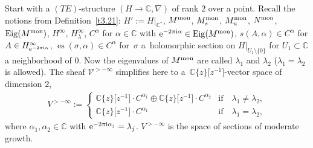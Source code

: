 \documentclass[10pt,a4paper]{amsart}
\numberwithin{equation}{section}
\numberwithin{figure}{section}
\newcommand{\C}{{\mathbb C}}
\newcommand{\VV}{{\mathcal V}}
\newcommand{\nnn}{\nabla}
\DeclareMathOperator{\Eig}{Eig}
\begin{document}
\begin{Notation}\label{t4.16}
Start with a $(TE)$-structure $(H\to\C,\nnn)$ of rank $2$
over a point. Recall the notions from Definition~\ref{t3.21}:
$H':=H|_{\C^*}$, $M^{\rm mon}$, $M^{\rm mon}_s$, $M^{\rm mon}_u$, $N^{\rm mon}$,
$\Eig(M^{\rm mon})$, $H^\infty$, $H^\infty_{\lambda}$, $C^\alpha$
for $\alpha\in\C$ with ${\rm e}^{-2\pi {\rm i}\alpha}\in \Eig(M^{\rm mon})$,
$s(A,\alpha)\in C^\alpha$ for
$A\in H^{\infty}_{{\rm e}^{-2\pi {\rm i}\alpha}}$,
$\operatorname{es}(\sigma,\alpha)\in C^\alpha$ for~$\sigma$
a~holomorphic section on $H|_{U_1\setminus\{0\}}$ for
$U_1\subset\C$ a neighborhood of 0.
Now the eigenvalues of $M^{\rm mon}$ are called $\lambda_1$
and $\lambda_2$ ($\lambda_1=\lambda_2$ is allowed).
The sheaf $\VV^{>-\infty}$ simplifies here to a~$\C\{z\}\big[z^{-1}\big]$-vector space of dimension $2$,
\begin{gather*}%
V^{>-\infty}:= \begin{cases}
\C\{z\}\big[z^{-1}\big]\cdot C^{\alpha_1}
\oplus \C\{z\}\big[z^{-1}\big]\cdot C^{\alpha_2}&
\text{if}\quad\lambda_1\neq\lambda_2,
\\[1ex]
\C\{z\}\big[z^{-1}\big]\cdot C^{\alpha_1}&
\text{if}\quad\lambda_1=\lambda_2,\end{cases}
\end{gather*}
where $\alpha_1,\alpha_2\in\C$ with
${\rm e}^{-2\pi {\rm i}\alpha_j}=\lambda_j$.
$V^{>-\infty}$ is the space of sections of moderate growth.
\end{Notation}
\end{document}
